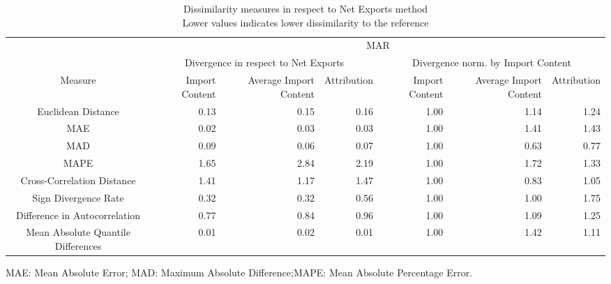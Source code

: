 \begin{table}[t]
\caption*{
{\large Dissimilarity measures in respect to Net Exports method} \\ 
{\small Lower values indicates lower dissimilarity to the reference}
} 
\fontsize{15.0pt}{18.0pt}\selectfont
\begin{tabular*}{\linewidth}{@{\extracolsep{\fill}}crrrrrr}
\toprule
 & \multicolumn{6}{c}{MAR} \\ 
\cmidrule(lr){2-7}
 & \multicolumn{3}{c}{Divergence in respect to Net Exports} & \multicolumn{3}{c}{Divergence norm. by Import Content} \\ 
\cmidrule(lr){2-4} \cmidrule(lr){5-7}
Measure & Import Content & Average Import Content & Attribution & Import Content & Average Import Content & Attribution \\ 
\midrule\addlinespace[2.5pt]
Euclidean Distance & 0.13 & 0.15 & 0.16 & 1.00 & 1.14 & 1.24 \\ 
MAE & 0.02 & 0.03 & 0.03 & 1.00 & 1.41 & 1.43 \\ 
MAD & 0.09 & 0.06 & 0.07 & 1.00 & 0.63 & 0.77 \\ 
MAPE & 1.65 & 2.84 & 2.19 & 1.00 & 1.72 & 1.33 \\ 
Cross-Correlation Distance & 1.41 & 1.17 & 1.47 & 1.00 & 0.83 & 1.05 \\ 
Sign Divergence Rate & 0.32 & 0.32 & 0.56 & 1.00 & 1.00 & 1.75 \\ 
Difference in Autocorrelation & 0.77 & 0.84 & 0.96 & 1.00 & 1.09 & 1.25 \\ 
Mean Absolute Quantile Differences & 0.01 & 0.02 & 0.01 & 1.00 & 1.42 & 1.11 \\ 
\bottomrule
\end{tabular*}
\begin{minipage}{\linewidth}
MAE: Mean Absolute Error; MAD: Maximum Absolute Difference;MAPE: Mean Absolute Percentage Error.\\
\end{minipage}
\end{table}

